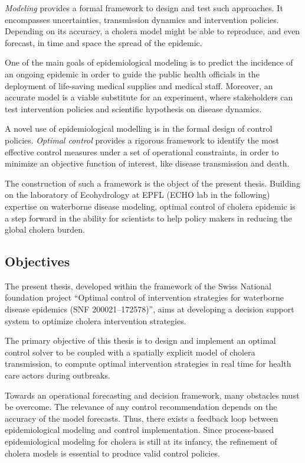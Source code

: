 
\textit{Modeling} provides a formal framework to design and test such approaches. It encompasses uncertainties, transmission dynamics and intervention policies. Depending on its accuracy, a cholera model might be able to reproduce, and even forecast, in time and space the spread of the epidemic.

One of the main goals of epidemiological modeling is to predict the incidence of an ongoing epidemic in order to guide the public health officials in the deployment of life-saving medical supplies and medical staff. Moreover, an accurate model is a viable substitute for an experiment, where stakeholders can test intervention policies and scientific hypothesis on disease dynamics.

A novel use of epidemiological modelling is in the formal design of control policies. \textit{Optimal control} provides a rigorous framework to identify the most effective control measures under a set of operational constraints, in order to minimize an objective function of interest, like disease transmission and death. 

The construction of such a framework is the object of the present thesis. Building on the laboratory of Ecohydrology at EPFL (ECHO lab in the following) expertise on waterborne disease modeling, optimal control of cholera epidemic is a step forward in the ability for scientists to help policy makers in reducing the global cholera burden.

\subsection{Objectives}

The present thesis, developed within the framework of the Swiss National foundation project ``Optimal
control of intervention strategies for waterborne disease epidemics (SNF 200021--172578)'', aims at developing a decision support system to optimize cholera intervention strategies.

The  primary objective of this thesis is to design and implement an optimal control solver to be coupled with a spatially explicit model of cholera transmission, to compute optimal intervention strategies in real time for health care actors during outbreaks.

Towards an operational forecasting and decision framework, many obstacles must be overcome. The relevance of any control recommendation depends on the accuracy of the model forecasts. Thus, there exists a feedback loop between epidemiological modeling and control implementation. Since process-based epidemiological modeling for cholera is still at its infancy, the refinement of cholera models is essential to produce valid control policies.


